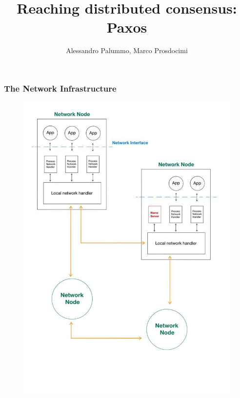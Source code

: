 \documentclass{beamer}
\title{Reaching distributed consensus: Paxos}
\author{Alessandro Palummo, Marco Prosdocimi}
\begin{document}
\begin{frame}
  \maketitle
\end{frame}

\begin{frame}
  \frametitle{The Network Infrastructure}
  \begin{figure}
    \centering
    \includegraphics[scale=0.2]{netInfr.jpg}
  \end{figure}
\end{frame}
\end{document}
